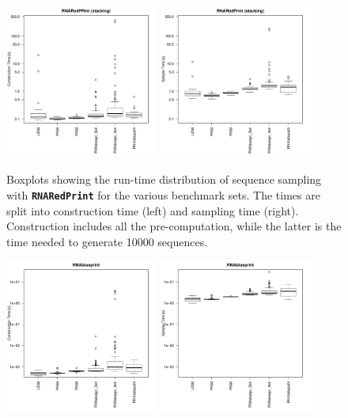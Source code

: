 \documentclass[10pt]{article}
\newcommand{\ourprog}{{\tt \bfseries{}\color{black!85}RNA\textcolor{red!70!black}{Red}Print}}
\newenvironment{revision}{\color{red}}{\color{black}}
\begin{document}
\begin{revision}
\begin{figure}[h!]
  \centering
  \includegraphics[width=0.45\textwidth]{Figs/RunTimes/construction_time_sets}\quad%
  \includegraphics[width=0.45\textwidth]{Figs/RunTimes/sample_time_sets}
  \caption{Boxplots showing the run-time distribution of sequence sampling with \ourprog{} for the various benchmark sets. The times are split into construction time (left) and sampling time (right). Construction includes all the pre-computation, while the latter is the time needed to generate 10000 sequences. }
  \label{fig:run-times-redprint}
\end{figure}
\begin{figure}[h!]
  \centering
  \includegraphics[width=0.45\textwidth]{Figs/RunTimes/construction_time_sets_rbp}\quad%
  \includegraphics[width=0.45\textwidth]{Figs/RunTimes/sample_time_sets_rbp}

\end{figure}
\end{revision}
\end{document}
